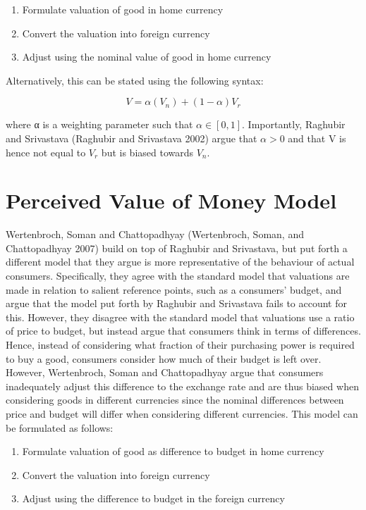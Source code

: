 \documentclass[
]{report}
\providecommand{\tightlist}{%
  \setlength{\itemsep}{0pt}\setlength{\parskip}{0pt}}\usepackage{longtable,booktabs,array}
\begin{document}
\begin{enumerate}
\def\labelenumi{\arabic{enumi}.}
\tightlist
\item
  Formulate valuation of good in home currency
\item
  Convert the valuation into foreign currency
\item
  Adjust using the nominal value of good in home currency
\end{enumerate}

Alternatively, this can be stated using the following syntax:

\[V = α(V_n) + (1 - α)V_r\]

where α is a weighting parameter such that \(α ∈[0,1]\). Importantly,
Raghubir and Srivastava (Raghubir and Srivastava 2002) argue that
\(α > 0\) and that V is hence not equal to \(V_r\) but is biased towards
\(V_n\).

\section{Perceived Value of Money
Model}\label{perceived-value-of-money-model}

Wertenbroch, Soman and Chattopadhyay (Wertenbroch, Soman, and
Chattopadhyay 2007) build on top of Raghubir and Srivastava, but put
forth a different model that they argue is more representative of the
behaviour of actual consumers. Specifically, they agree with the
standard model that valuations are made in relation to salient reference
points, such as a consumers' budget, and argue that the model put forth
by Raghubir and Srivastava fails to account for this. However, they
disagree with the standard model that valuations use a ratio of price to
budget, but instead argue that consumers think in terms of differences.
Hence, instead of considering what fraction of their purchasing power is
required to buy a good, consumers consider how much of their budget is
left over. However, Wertenbroch, Soman and Chattopadhyay argue that
consumers inadequately adjust this difference to the exchange rate and
are thus biased when considering goods in different currencies since the
nominal differences between price and budget will differ when
considering different currencies. This model can be formulated as
follows:

\begin{enumerate}
\def\labelenumi{\arabic{enumi}.}
\tightlist
\item
  Formulate valuation of good as difference to budget in home currency
\item
  Convert the valuation into foreign currency
\item
  Adjust using the difference to budget in the foreign currency
\end{enumerate}
\end{document}

